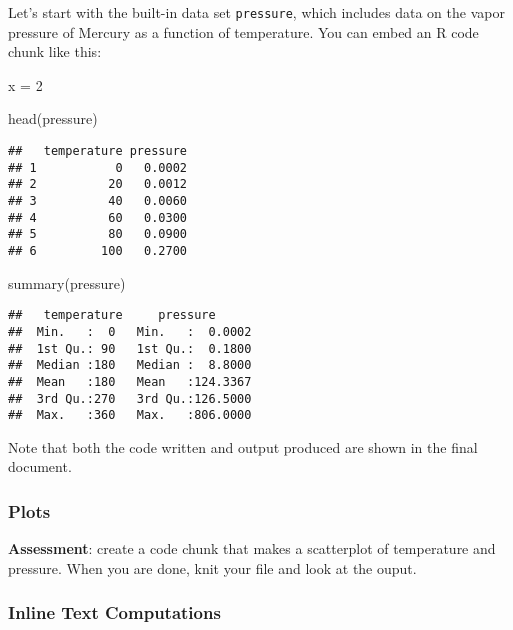 \documentclass[
]{article}
\newenvironment{Shaded}{\begin{snugshade}}{\end{snugshade}}
\newcommand{\DecValTok}[1]{\textcolor[rgb]{0.00,0.00,0.81}{#1}}
\newcommand{\FunctionTok}[1]{\textcolor[rgb]{0.00,0.00,0.00}{#1}}
\newcommand{\NormalTok}[1]{#1}
\newcommand{\OtherTok}[1]{\textcolor[rgb]{0.56,0.35,0.01}{#1}}
\begin{document}
Let's start with the built-in data set \texttt{pressure}, which includes
data on the vapor pressure of Mercury as a function of temperature. You
can embed an R code chunk like this:

\begin{Shaded}
\begin{Highlighting}[]
\NormalTok{x }\OtherTok{=} \DecValTok{2}
\end{Highlighting}
\end{Shaded}

\begin{Shaded}
\begin{Highlighting}[]
\FunctionTok{head}\NormalTok{(pressure)}
\end{Highlighting}
\end{Shaded}

\begin{verbatim}
##   temperature pressure
## 1           0   0.0002
## 2          20   0.0012
## 3          40   0.0060
## 4          60   0.0300
## 5          80   0.0900
## 6         100   0.2700
\end{verbatim}

\begin{Shaded}
\begin{Highlighting}[]
\FunctionTok{summary}\NormalTok{(pressure)}
\end{Highlighting}
\end{Shaded}

\begin{verbatim}
##   temperature     pressure       
##  Min.   :  0   Min.   :  0.0002  
##  1st Qu.: 90   1st Qu.:  0.1800  
##  Median :180   Median :  8.8000  
##  Mean   :180   Mean   :124.3367  
##  3rd Qu.:270   3rd Qu.:126.5000  
##  Max.   :360   Max.   :806.0000
\end{verbatim}

Note that both the code written and output produced are shown in the
final document.

\hypertarget{plots}{%
\subsubsection{Plots}\label{plots}}

\textbf{Assessment}: create a code chunk that makes a scatterplot of
temperature and pressure. When you are done, knit your file and look at
the ouput.

\hypertarget{inline-text-computations}{%
\subsubsection{Inline Text
Computations}\label{inline-text-computations}}
\end{document}
